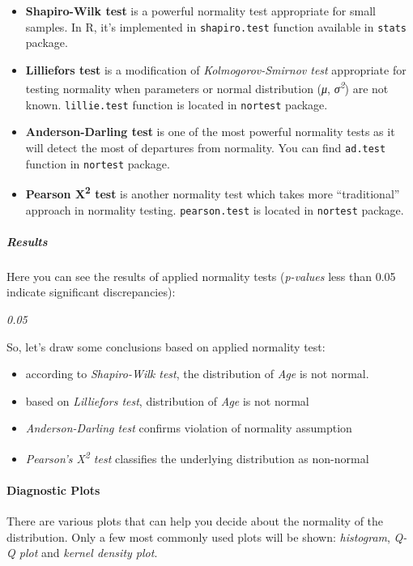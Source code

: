 \documentclass[]{article}
\begin{document}
\begin{itemize}
\item
  \textbf{Shapiro-Wilk test} is a powerful normality test appropriate
  for small samples. In R, it's implemented in \texttt{shapiro.test}
  function available in \texttt{stats} package.
\item
  \textbf{Lilliefors test} is a modification of \emph{Kolmogorov-Smirnov
  test} appropriate for testing normality when parameters or normal
  distribution (\emph{μ}, \emph{σ\textsuperscript{2}}) are not known.
  \texttt{lillie.test} function is located in \texttt{nortest} package.
\item
  \textbf{Anderson-Darling test} is one of the most powerful normality
  tests as it will detect the most of departures from normality. You can
  find \texttt{ad.test} function in \texttt{nortest} package.
\item
  \textbf{Pearson Χ\textsuperscript{2} test} is another normality test
  which takes more ``traditional'' approach in normality testing.
  \texttt{pearson.test} is located in \texttt{nortest} package.
\end{itemize}
\subparagraph{Results}

Here you can see the results of applied normality tests (\emph{p-values}
less than 0.05 indicate significant discrepancies):

\emph{0.05}

So, let's draw some conclusions based on applied normality test:

\begin{itemize}
\item
  according to \emph{Shapiro-Wilk test}, the distribution of \emph{Age}
  is not normal.
\item
  based on \emph{Lilliefors test}, distribution of \emph{Age} is not
  normal
\item
  \emph{Anderson-Darling test} confirms violation of normality
  assumption
\item
  \emph{Pearson's Χ\textsuperscript{2} test} classifies the underlying
  distribution as non-normal
\end{itemize}
\paragraph{Diagnostic Plots}

There are various plots that can help you decide about the normality of
the distribution. Only a few most commonly used plots will be shown:
\emph{histogram}, \emph{Q-Q plot} and \emph{kernel density plot}.
\end{document}
